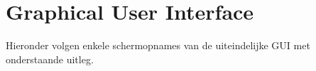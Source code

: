 \documentclass[11pt,a4paper]{article}
\begin{document}
\section{Graphical User Interface}
\label{sec:GUIpics}
	Hieronder volgen enkele schermopnames van de uiteindelijke GUI met onderstaande uitleg.  \\ \newline
	\hspace*{-5pt}
\end{document}
